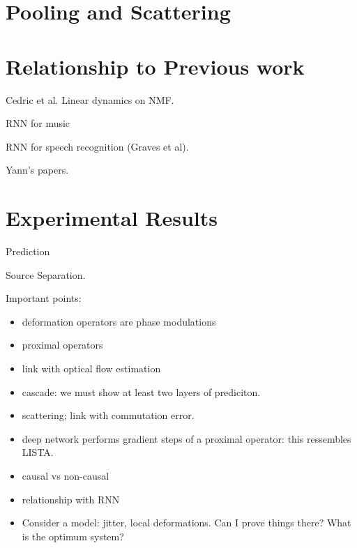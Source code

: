 \documentclass[11pt]{article} %
\begin{document}
\section{Pooling and Scattering}

\section{Relationship to Previous work}

Cedric et al. Linear dynamics on NMF. 

RNN for music

RNN for speech recognition (Graves et al). 

Yann's papers.

\section{Experimental Results}

Prediction

Source Separation.





Important points:

\begin{itemize}
\item deformation operators are phase modulations 
\item proximal operators
\item link with optical flow estimation
\item cascade: we must show at least two layers of prediciton.
\item scattering; link with commutation error.
\item deep network performs gradient steps of a proximal operator: this ressembles LISTA.
\item causal vs non-causal
\item relationship with RNN
\item Consider a model: jitter, local deformations. Can I prove things there? What is the optimum system?
\end{itemize}
\end{document}
